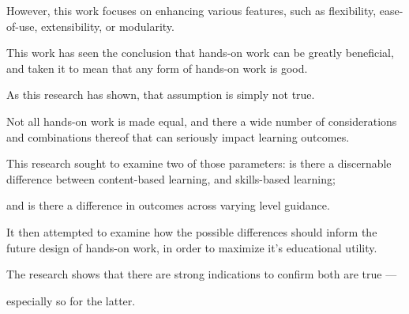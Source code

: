 However, this work focuses on enhancing various features, such as flexibility, ease-of-use, extensibility, or modularity. %







This work has seen the conclusion that hands-on work can be greatly beneficial, and taken it to mean that any form of hands-on work is good. %







As this research has shown, that assumption is simply not true. 















Not all hands-on work is made equal, and there a wide number of considerations and combinations thereof that can seriously impact learning outcomes. %







This research sought to examine two of those parameters: is there a discernable difference between content-based learning, and skills-based learning; %







and is there a difference in outcomes across varying level guidance. %







It then attempted to examine how the possible differences should inform the future design of hands-on work, in order to maximize it's educational utility. %







The research shows that there are strong indications to confirm both are true ---%







 especially so for the latter. %







